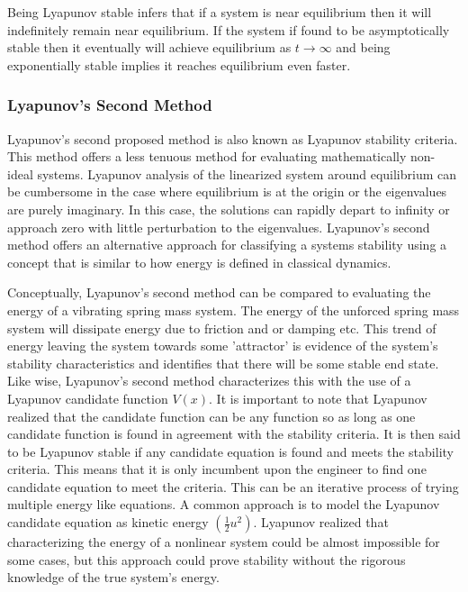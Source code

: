 Being Lyapunov stable infers that if a system is near equilibrium then it will indefinitely remain near equilibrium.  If the system if found to be asymptotically stable then it eventually will achieve equilibrium as $t\to \infty$ and being exponentially stable implies it reaches equilibrium even faster.

\subsubsection{Lyapunov's Second Method}
 
Lyapunov's second proposed method is also known as Lyapunov stability criteria.  This method offers a less tenuous method for evaluating mathematically non-ideal systems.  Lyapunov analysis of the linearized system around equilibrium can be cumbersome in the case where equilibrium is at the origin or the eigenvalues are purely imaginary.  In this case, the solutions can rapidly depart to infinity or approach zero with little perturbation to the eigenvalues.  Lyapunov's second method offers an alternative approach for classifying a systems stability using a concept that is similar to how energy is defined in classical dynamics.

Conceptually, Lyapunov's second method can be compared to evaluating the energy of a vibrating spring mass system.  The energy of the unforced spring mass system will dissipate energy due to friction and or damping etc.  This trend of energy leaving the system towards some 'attractor' is evidence of the system's stability characteristics and identifies that there will be some stable end state.  Like wise, Lyapunov's second method characterizes this with the use of a Lyapunov candidate function $V(x)$.  It is important to note that Lyapunov realized that the candidate function can be any function so as long as one candidate function is found in agreement with the stability criteria.  It is then said to be Lyapunov stable if any candidate equation is found and meets the stability criteria.  This means that it is only incumbent upon the engineer to find one candidate equation to meet the criteria.  This can be an iterative process of trying multiple energy like equations.  A common approach is to model the Lyapunov candidate equation as kinetic energy $(\frac{1}{2}u^2)$.  Lyapunov realized that characterizing the energy of a nonlinear system could be almost impossible for some cases, but this approach could prove stability without the rigorous knowledge of the true system's energy.

